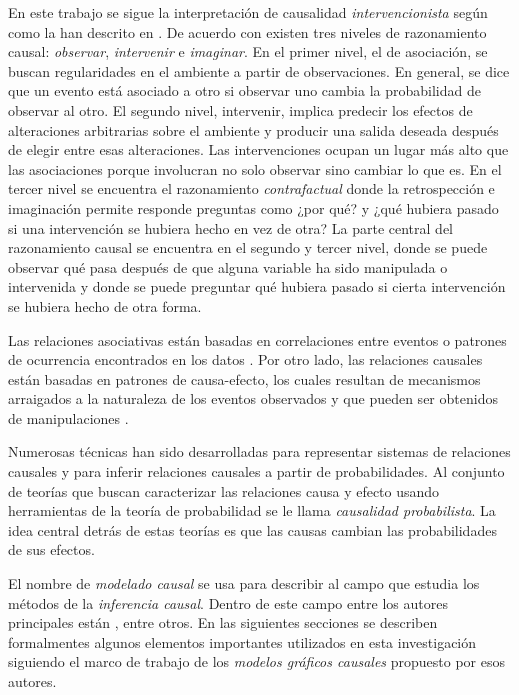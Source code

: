 En este trabajo se sigue la interpretación de causalidad  
\textit{intervencionista} según como la han descrito en \cite{woodward2005making, spirtes2000causation, pearl_2009}.
De acuerdo con \cite{pearl2018bookofwhy} existen tres niveles
de razonamiento causal: \textit{observar}, \textit{intervenir}
e \textit{imaginar}.
En el primer nivel, el de asociación, se buscan regularidades
en el ambiente a partir de observaciones. 
En general, se dice que un evento está asociado a otro si observar uno
cambia la probabilidad de observar al otro.
El segundo nivel, intervenir, implica predecir los 
efectos de alteraciones arbitrarias sobre el ambiente
y producir una salida deseada después de elegir entre esas alteraciones. Las intervenciones ocupan un lugar más alto que las
asociaciones porque involucran
no solo observar sino cambiar lo que es.
En el tercer nivel se encuentra
el razonamiento \textit{contrafactual} donde la retrospección
e imaginación permite responde preguntas como ¿por qué?
y ¿qué hubiera pasado si una intervención se hubiera hecho 
en vez de otra?
La parte central del razonamiento causal se encuentra en el segundo
y tercer nivel, donde se puede observar qué pasa después de que 
alguna variable ha sido manipulada o intervenida y donde se puede
preguntar qué hubiera pasado si cierta intervención se hubiera 
hecho de otra forma.

Las relaciones asociativas están basadas en correlaciones
entre eventos o patrones de ocurrencia encontrados en los
datos \cite{pearl2018bookofwhy}. Por otro lado, las relaciones
causales están basadas en patrones de causa-efecto,
los cuales resultan de mecanismos arraigados a la naturaleza
de los eventos observados y que pueden ser obtenidos de 
manipulaciones \cite{sep-causal-models}.

Numerosas técnicas han sido desarrolladas para representar
sistemas de relaciones causales y para inferir 
relaciones causales a partir de probabilidades.
Al conjunto de teorías que buscan caracterizar las
relaciones causa y efecto usando herramientas de la
teoría de probabilidad se le llama \textit{causalidad probabilista}. 
La idea central detrás de estas teorías es que las causas cambian las probabilidades de sus efectos.

El nombre de \textit{modelado causal} se usa para describir al campo 
que estudia los métodos de la \textit{inferencia causal}. Dentro de este campo
entre los autores principales están \cite{pearl2010introduction, spirtes2000causation}, entre otros. En las siguientes secciones
se describen formalmentes algunos elementos importantes utilizados en esta investigación
siguiendo el marco de trabajo de los \textit{modelos gráficos causales} propuesto por esos autores.

